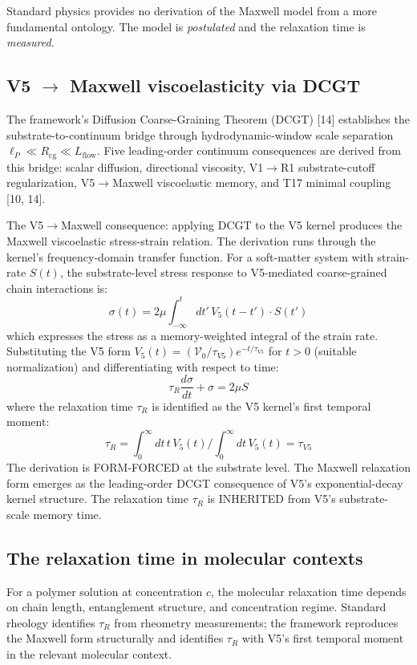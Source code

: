 \documentclass[11pt,a4paper]{article}
\begin{document}
Standard physics provides no derivation of the Maxwell model from a more fundamental ontology. The model is \emph{postulated} and the relaxation time is \emph{measured}.

\subsection{V5 $\to$ Maxwell viscoelasticity via DCGT}

The framework's Diffusion Coarse-Graining Theorem (DCGT) [14] establishes the substrate-to-continuum bridge through hydrodynamic-window scale separation $\ell_P \ll R_\mathrm{cg} \ll L_\mathrm{flow}$. Five leading-order continuum consequences are derived from this bridge: scalar diffusion, directional viscosity, V1$\to$R1 substrate-cutoff regularization, V5$\to$Maxwell viscoelastic memory, and T17 minimal coupling [10, 14].

The V5$\to$Maxwell consequence: applying DCGT to the V5 kernel produces the Maxwell viscoelastic stress-strain relation. The derivation runs through the kernel's frequency-domain transfer function. For a soft-matter system with strain-rate $S(t)$, the substrate-level stress response to V5-mediated coarse-grained chain interactions is:
\[
\sigma(t) = 2\mu \int_{-\infty}^{t} dt' \, V_5(t-t') \cdot S(t')
\]
which expresses the stress as a memory-weighted integral of the strain rate. Substituting the V5 form $V_5(t) = (\mathcal{V}_0/\tau_{V5}) e^{-t/\tau_{V5}}$ for $t > 0$ (suitable normalization) and differentiating with respect to time:
\[
\tau_R \frac{d\sigma}{dt} + \sigma = 2\mu S
\]
where the relaxation time $\tau_R$ is identified as the V5 kernel's first temporal moment:
\[
\tau_R = \int_0^\infty dt \, t \, V_5(t) \bigg/ \int_0^\infty dt \, V_5(t) = \tau_{V5}
\]
The derivation is FORM-FORCED at the substrate level. The Maxwell relaxation form emerges as the leading-order DCGT consequence of V5's exponential-decay kernel structure. The relaxation time $\tau_R$ is INHERITED from V5's substrate-scale memory time.

\subsection{The relaxation time in molecular contexts}

For a polymer solution at concentration $c$, the molecular relaxation time depends on chain length, entanglement structure, and concentration regime. Standard rheology identifies $\tau_R$ from rheometry measurements; the framework reproduces the Maxwell form structurally and identifies $\tau_R$ with V5's first temporal moment in the relevant molecular context.
\end{document}

